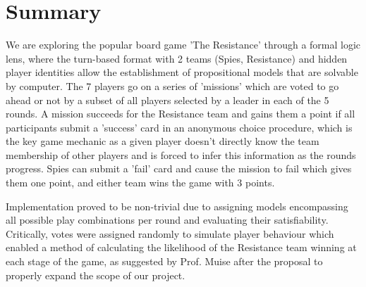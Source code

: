 \documentclass[pdftex,10pt,a4paper]{article}
\numberwithin{equation}{section} %
\begin{document}
\tableofcontents

\section*{Summary}
We are exploring the popular board game 'The Resistance' through a formal logic lens, where the turn-based format with 2 teams (Spies, Resistance) and hidden player identities allow the establishment of propositional models that are solvable by computer. The 7 players go on a series of 'missions' which are voted to go ahead or not by a subset of all players selected by a leader in each of the 5 rounds. A mission succeeds for the Resistance team and gains them a point if all participants submit a 'success' card in an anonymous choice procedure, which is the key game mechanic as a given player doesn't directly know the team membership of other players and is forced to infer this information as the rounds progress. Spies can submit a 'fail' card and cause the mission to fail which gives them one point, and either team wins the game with 3 points.

Implementation proved to be non-trivial due to assigning models encompassing all possible play combinations per round and evaluating their satisfiability. Critically, votes were assigned randomly to simulate player behaviour which enabled a method of calculating the likelihood of the Resistance team winning at each stage of the game, as suggested by Prof. Muise after the proposal to properly expand the scope of our project. 
\end{document}

